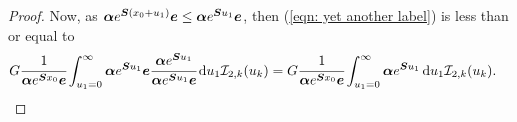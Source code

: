 \begin{proof}
	Now, as \( \boldsymbol \alpha e^{\boldsymbol{S}(x_0 +u_1)}\boldsymbol e \leq \boldsymbol \alpha e^{\boldsymbol{S}u_1}\boldsymbol e \), then (\ref{eqn: yet another label}) is less than or equal to 
	\begin{align}
		&G  \cfrac{1}{\bs \alpha e^{\bs{S}x_0}\bs e} \int_{u_1=0}^\infty \bs \alpha e^{\bs{S}u_1}\bs e \cfrac{\bs \alpha e^{\bs{S}u_1}}{\bs \alpha e^{\bs{S}u_1}\bs e}\wrt u_1 \mathcal I_{2,k}(u_k) \nonumber
		=G  \cfrac{1}{\bs \alpha e^{\bs{S} x_0 }\bs e} \int_{u_1=0}^\infty \bs \alpha e^{\bs{S}u_1}\wrt u_1 \mathcal I_{2,k}(u_k) . %

\end{align}
\end{proof}
